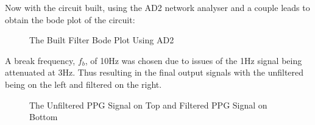 \documentclass{article}
\begin{document}
Now with the circuit built, using the AD2 network analyser and a couple leads to obtain the bode plot of the circuit:
\begin{figure}[h]
    \centering
    \caption{The Built Filter Bode Plot Using AD2}
    \label{figure:BuildFilterBodePlot}
\end{figure}
\newpage
A break frequency, $f_b$, of 10Hz was chosen due to issues of the 1Hz signal being attenuated at 3Hz. Thus resulting in the final output signals with the unfiltered being on the left and filtered on the right.
\begin{figure}[h]
    \centering
    \caption{The Unfiltered PPG Signal on Top and Filtered PPG Signal on Bottom}
    \label{figure:FilteredandUnfilteredSignal}
\end{figure}
\end{document}

